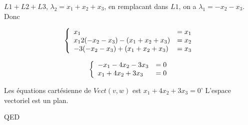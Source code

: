 \documentclass[]{book}
\theoremstyle{definition}
\begin{document}
$L1+L2+L3$, $\lambda_2 = x_1+x_2+x_3$, en remplacant dans $L1$, on a $\lambda_1 = -x_2 - x_3$. Donc

$$
\left\{ 
\begin{array}{l l}
x_1 & = x_1 \\x_1
2(-x_2 - x_3) - (x_1 + x_2 + x_3) & = x_2 \\
-3(-x_2 - x_3) + (x_1 + x_2 + x_3) & = x_3 \\
\end{array}
\right. 
$$

$$
\left\{ 
\begin{array}{l l}
-x_1 - 4x_2 - 3x_3 & = 0 \\
x_1 + 4x_2 + 3x_3 & = 0 \\
\end{array}
\right. 
$$

Les \'equations cart\'esienne de $Vect(v,w)$ est $x_1 + 4x_2 + 3x_3 =0$' L'espace vectoriel est un plan.




QED
\end{document}
